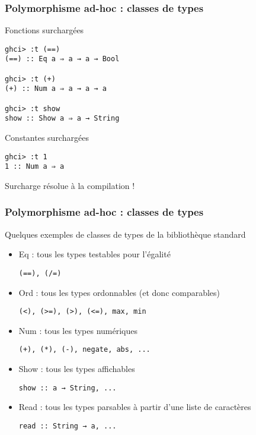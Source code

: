 \documentclass[10pt]{beamer}
\begin{document}
\begin{frame}[fragile]
\frametitle{Polymorphisme ad-hoc : classes de types}
\begin{block}
{Fonctions surchargées}
\begin{verbatim}
ghci> :t (==)
(==) :: Eq a ⇒ a → a → Bool

ghci> :t (+)
(+) :: Num a ⇒ a → a → a

ghci> :t show
show :: Show a ⇒ a → String
\end{verbatim}
\end{block}
\begin{block}
{Constantes surchargées}
\begin{verbatim}
ghci> :t 1
1 :: Num a ⇒ a
\end{verbatim}
\end{block}
Surcharge résolue à la compilation !
\end{frame}



\begin{frame}[fragile]
\frametitle{Polymorphisme ad-hoc : classes de types}
\begin{block}
{Quelques exemples de classes de types de la bibliothèque standard}
\begin{itemize}

\item Eq : tous les types testables pour l'égalité

\verb|(==), (/=)|

\item Ord : tous les types ordonnables (et donc comparables)

\verb|(<), (>=), (>), (<=), max, min|

\item Num : tous les types numériques

\verb|(+), (*), (-), negate, abs, ...|

\item Show : tous les types affichables

\verb|show :: a → String, ...|

\item Read : tous les types parsables à partir d'une liste de caractères

\verb|read :: String → a, ...|

\end{itemize}
\end{block}
\end{frame}
\end{document}
